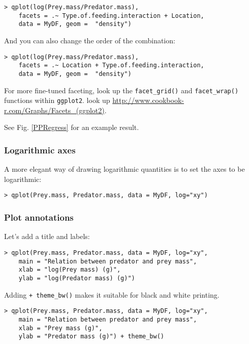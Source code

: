 \begin{lstlisting}
> qplot(log(Prey.mass/Predator.mass), 
	facets = .~ Type.of.feeding.interaction + Location, 
	data = MyDF, geom =  "density")
\end{lstlisting}

And you can also change the order of the combination:

\begin{lstlisting}
> qplot(log(Prey.mass/Predator.mass), 
	facets = .~ Location + Type.of.feeding.interaction, 
	data = MyDF, geom =  "density")
\end{lstlisting}

\begin{tipbox}
	For more fine-tuned faceting, look up the {\tt facet\_grid()} and 
	{\tt facet\_wrap()} functions within {\tt ggplot2}. look up \url{ 
	http://www.cookbook-r.com/Graphs/Facets_(ggplot2)}. 
	
	See Fig. \ref{PPRegress} for an example result. 
\end{tipbox}

\subsubsection{Logarithmic axes}
A more elegant way of drawing logarithmic quantities is to set the axes 
to be logarithmic:

\begin{lstlisting}
> qplot(Prey.mass, Predator.mass, data = MyDF, log="xy")
\end{lstlisting}

\subsubsection{Plot annotations}

Let's add a title and labels:

\begin{lstlisting}
> qplot(Prey.mass, Predator.mass, data = MyDF, log="xy",
	main = "Relation between predator and prey mass", 
	xlab = "log(Prey mass) (g)", 
	ylab = "log(Predator mass) (g)")
\end{lstlisting}

Adding {\tt + theme\_bw()} makes it suitable for black and white
printing.

\begin{lstlisting}
> qplot(Prey.mass, Predator.mass, data = MyDF, log="xy",
	main = "Relation between predator and prey mass", 
	xlab = "Prey mass (g)", 
	ylab = "Predator mass (g)") + theme_bw()
\end{lstlisting}

